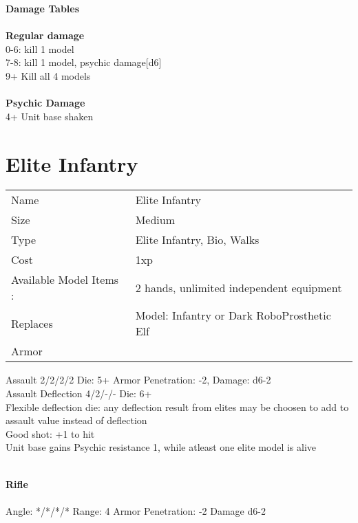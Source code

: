 {\bf Damage Tables} \\
\ \\ {\bf Regular damage } \\
0-6: kill 1 model \\
7-8: kill 1 model, psychic damage[d6] \\
9+ Kill all 4 models \\
\ \\ {\bf Psychic Damage } \\
4+ Unit base shaken \\









\pagebreak

\section{ Elite Infantry }

\begin{tabular}{ll}
  Name & Elite Infantry \\
  Size & Medium\\
  Type & Elite Infantry, Bio, Walks\\
  Cost & 1xp\\
  Available Model Items : &2 hands, unlimited independent equipment\\
  Replaces & Model: Infantry or Dark RoboProsthetic Elf\\
  Armor & 
\end{tabular}



Assault 2/2/2/2 Die: 5+ Armor Penetration: -2, Damage: d6-2 \\
Assault Deflection 4/2/-/- Die: 6+\\
Flexible deflection die: any deflection result from elites may be choosen to add to assault value instead of deflection
\ \\

Good shot: +1 to hit \\ Unit base gains Psychic resistance 1, while atleast one elite model is alive

\ \\
{\bf Rifle } \\
\ \\
Angle: */*/*/* Range: 4 Armor Penetration: -2 Damage d6-2 \\
\indent  \\





